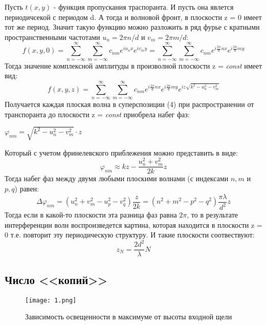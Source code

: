 \documentclass{urticle}
\begin{document}
    Пусть $t(x,y)$ - функция пропускания траспоранта. И пусть она явлется периодичсекой с периодом d. А тогда и волновой фронт, в плоскости z = 0 имеет тот же период. Значит такую функцию можно разложить в ряд фурье с кратными пространственными частотами $u_n = {2\pi n}/{d}$ и $v_m = {2\pi m}/{d}$:
    \begin{equation}
        f(x,y,0) = \sum_{n=-\infty}^{\infty} \sum_{m=-\infty}^{\infty} c_{nm} e^{i u_n x} e^{i v_m y} = \sum_{n=-\infty}^{\infty} \sum_{m=-\infty}^{\infty} c_{nm} e^{i\frac{2\pi}{d}nx} e^{i\frac{2\pi}{d}my}
    \end{equation}
    Тогда значение комплексной амплитуды в произволной плоскости z = \textit{const} имеет вид:
    \begin{equation}
        f(x,y,z) = \sum_{n=-\infty}^{\infty} \sum_{m=-\infty}^{\infty} c_{nm} e^{i\frac{2\pi}{d}nx} e^{i\frac{2\pi}{d}my} e^{iz\sqrt{k^2-u_n^2-v_m^2}}
    \end{equation}
    Получается каждая плоская волна в суперспозиции (4) при распространении от транспоранта до плоскости z = \textit{const} приобрела набег фаз: 
    \begin{center}
        $ \varphi_{nm} = \sqrt{k^2-u_n^2-v_m^2} \cdot z $
    \end{center}      
    Который с учетом фринелевского приблежения можно представить в виде:
    \begin{equation}
        \varphi_{nm} \approx kz - \frac{u_n^2 + v_m^2}{2k}z
    \end{equation}
    Тогда набег фаз между двумя любыми плоскими волнами (с индексами $n, m$ и $p, q$) равен:
    \begin{equation}
        \Delta \varphi_{nm} = (u_n^2 + v_m^2 - u_p^2 - v_q^2)\frac{z}{2k} = (n^2+m^2-p^2-q^2)\frac{\pi\lambda}{d^2}z
    \end{equation}
    Тогда если в какой-то плоскости эта разница фаз равна $2\pi$, то в результате интерференции волн воспроизведется картина, которая находится в плоскости z = 0 т.е. повторит эту периодическую структуру. И такие плоскости соотвествуют:
    \begin{equation}
        z_N = \frac{2d^2}{\lambda}N
    \end{equation}
    
\subsection{Число <<копий>>}

    \begin{wrapfigure}[13]{r}{0.5\linewidth} 
        \vspace{-5ex}
        \texttt{[image: 1.png]}
        \caption{Зависимость освещенности в максимуме от высоты входной щели}
        \label{f1}
    \end{wrapfigure}
\end{document}
